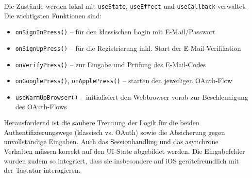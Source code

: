 Die Zustände werden lokal mit \texttt{useState}, \texttt{useEffect} und \texttt{useCallback} verwaltet. Die wichtigsten Funktionen sind:

\begin{itemize}
    \item \texttt{onSignInPress()} – für den klassischen Login mit E-Mail/Passwort
    \item \texttt{onSignUpPress()} – für die Registrierung inkl. Start der E-Mail-Verifikation
    \item \texttt{onVerifyPress()} – zur Eingabe und Prüfung des E-Mail-Codes
    \item \texttt{onGooglePress()}, \texttt{onApplePress()} – starten den jeweiligen OAuth-Flow
    \item \texttt{useWarmUpBrowser()} – initialisiert den Webbrowser vorab zur Beschleunigung des OAuth-Flows
\end{itemize}

Herausfordernd ist die saubere Trennung der Logik für die beiden Authentifizierungswege (klassisch vs. OAuth) sowie die Absicherung gegen unvollständige Eingaben. Auch das Sessionhandling und das asynchrone Verhalten müssen korrekt auf den UI-State abgebildet werden. Die Eingabefelder wurden zudem so integriert, dass sie insbesondere auf iOS gerätefreundlich mit der Tastatur interagieren.

